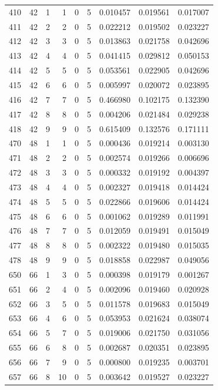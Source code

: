 \begin{longtable}{rrrrrrrrr}
410 & 42 & 1 & 1 & 0 & 5 & 0.010457 & 0.019561 & 0.017007 \\
411 & 42 & 2 & 2 & 0 & 5 & 0.022212 & 0.019502 & 0.023227 \\
412 & 42 & 3 & 3 & 0 & 5 & 0.013863 & 0.021758 & 0.042696 \\
413 & 42 & 4 & 4 & 0 & 5 & 0.041415 & 0.029812 & 0.050153 \\
414 & 42 & 5 & 5 & 0 & 5 & 0.053561 & 0.022905 & 0.042696 \\
415 & 42 & 6 & 6 & 0 & 5 & 0.005997 & 0.020072 & 0.023895 \\
416 & 42 & 7 & 7 & 0 & 5 & 0.466980 & 0.102175 & 0.132390 \\
417 & 42 & 8 & 8 & 0 & 5 & 0.004206 & 0.021484 & 0.029238 \\
418 & 42 & 9 & 9 & 0 & 5 & 0.615409 & 0.132576 & 0.171111 \\
470 & 48 & 1 & 1 & 0 & 5 & 0.000436 & 0.019214 & 0.003130 \\
471 & 48 & 2 & 2 & 0 & 5 & 0.002574 & 0.019266 & 0.006696 \\
472 & 48 & 3 & 3 & 0 & 5 & 0.000332 & 0.019192 & 0.004397 \\
473 & 48 & 4 & 4 & 0 & 5 & 0.002327 & 0.019418 & 0.014424 \\
474 & 48 & 5 & 5 & 0 & 5 & 0.022866 & 0.019606 & 0.014424 \\
475 & 48 & 6 & 6 & 0 & 5 & 0.001062 & 0.019289 & 0.011991 \\
476 & 48 & 7 & 7 & 0 & 5 & 0.012059 & 0.019491 & 0.015049 \\
477 & 48 & 8 & 8 & 0 & 5 & 0.002322 & 0.019480 & 0.015035 \\
478 & 48 & 9 & 9 & 0 & 5 & 0.018858 & 0.022987 & 0.049056 \\
650 & 66 & 1 & 3 & 0 & 5 & 0.000398 & 0.019179 & 0.001267 \\
651 & 66 & 2 & 4 & 0 & 5 & 0.002096 & 0.019460 & 0.020928 \\
652 & 66 & 3 & 5 & 0 & 5 & 0.011578 & 0.019683 & 0.015049 \\
653 & 66 & 4 & 6 & 0 & 5 & 0.053953 & 0.021624 & 0.038074 \\
654 & 66 & 5 & 7 & 0 & 5 & 0.019006 & 0.021750 & 0.031056 \\
655 & 66 & 6 & 8 & 0 & 5 & 0.002687 & 0.020351 & 0.023895 \\
656 & 66 & 7 & 9 & 0 & 5 & 0.000800 & 0.019235 & 0.003701 \\
657 & 66 & 8 & 10 & 0 & 5 & 0.003642 & 0.019527 & 0.023227 \\

\end{longtable}
